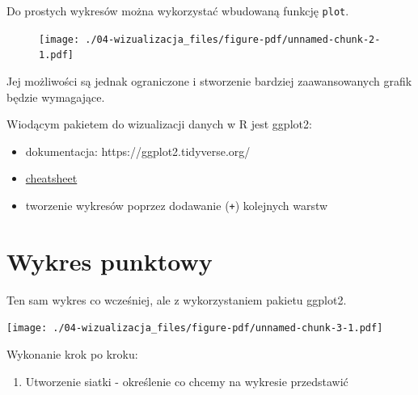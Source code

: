 \documentclass[
  letterpaper,
  DIV=11,
  numbers=noendperiod]{scrreprt}
\newenvironment{Shaded}{\begin{snugshade}}{\end{snugshade}}
\newcommand{\AttributeTok}[1]{\textcolor[rgb]{0.40,0.45,0.13}{#1}}
\newcommand{\FunctionTok}[1]{\textcolor[rgb]{0.28,0.35,0.67}{#1}}
\newcommand{\NormalTok}[1]{\textcolor[rgb]{0.00,0.23,0.31}{#1}}
\newcommand{\SpecialCharTok}[1]{\textcolor[rgb]{0.37,0.37,0.37}{#1}}
\newcommand{\StringTok}[1]{\textcolor[rgb]{0.13,0.47,0.30}{#1}}
\providecommand{\tightlist}{%
  \setlength{\itemsep}{0pt}\setlength{\parskip}{0pt}}\usepackage{longtable,booktabs,array}
\begin{document}
Do prostych wykresów można wykorzystać wbudowaną funkcję \texttt{plot}.

\begin{Shaded}
\end{Shaded}

\begin{figure}[H]

{\centering \texttt{[image: ./04-wizualizacja\_files/figure-pdf/unnamed-chunk-2-1.pdf]}

}

\end{figure}

Jej możliwości są jednak ograniczone i stworzenie bardziej
zaawansowanych grafik będzie wymagające.

Wiodącym pakietem do wizualizacji danych w R jest ggplot2:

\begin{itemize}
\tightlist
\item
  dokumentacja: https://ggplot2.tidyverse.org/
\item
  \href{https://github.com/rstudio/cheatsheets/blob/master/data-visualization-2.1.pdf}{cheatsheet}
\item
  tworzenie wykresów poprzez dodawanie (\texttt{+}) kolejnych warstw
\end{itemize}

\hypertarget{wykres-punktowy}{%
\section{Wykres punktowy}\label{wykres-punktowy}}

Ten sam wykres co wcześniej, ale z wykorzystaniem pakietu ggplot2.

\texttt{[image: ./04-wizualizacja\_files/figure-pdf/unnamed-chunk-3-1.pdf]}

Wykonanie krok po kroku:

\begin{enumerate}
\def\labelenumi{\arabic{enumi}.}
\tightlist
\item
  Utworzenie siatki - określenie co chcemy na wykresie przedstawić
\end{enumerate}
\end{document}
